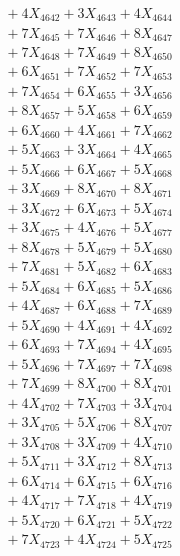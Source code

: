 \documentclass[a4paper,10pt]{article}
\begin{document}
{\begin{align}
&\;  + 4 X_{4642} + 3 X_{4643} + 4 X_{4644} \\[0.3ex]
&\;  + 7 X_{4645} + 7 X_{4646} + 8 X_{4647} \\[0.3ex]
&\;  + 7 X_{4648} + 7 X_{4649} + 8 X_{4650} \\[0.3ex]
&\;  + 6 X_{4651} + 7 X_{4652} + 7 X_{4653} \\[0.3ex]
&\;  + 7 X_{4654} + 6 X_{4655} + 3 X_{4656} \\[0.3ex]
&\;  + 8 X_{4657} + 5 X_{4658} + 6 X_{4659} \\[0.5ex]\allowbreak
&\;  + 6 X_{4660} + 4 X_{4661} + 7 X_{4662} \\[0.3ex]
&\;  + 5 X_{4663} + 3 X_{4664} + 4 X_{4665} \\[0.3ex]
&\;  + 5 X_{4666} + 6 X_{4667} + 5 X_{4668} \\[0.3ex]
&\;  + 3 X_{4669} + 8 X_{4670} + 8 X_{4671} \\[0.3ex]
&\;  + 3 X_{4672} + 6 X_{4673} + 5 X_{4674} \\[0.3ex]
&\;  + 3 X_{4675} + 4 X_{4676} + 5 X_{4677} \\[0.3ex]
&\;  + 8 X_{4678} + 5 X_{4679} + 5 X_{4680} \\[0.3ex]
&\;  + 7 X_{4681} + 5 X_{4682} + 6 X_{4683} \\[0.3ex]
&\;  + 5 X_{4684} + 6 X_{4685} + 5 X_{4686} \\[0.3ex]
&\;  + 4 X_{4687} + 6 X_{4688} + 7 X_{4689} \\[0.5ex]\allowbreak
&\;  + 5 X_{4690} + 4 X_{4691} + 4 X_{4692} \\[0.3ex]
&\;  + 6 X_{4693} + 7 X_{4694} + 4 X_{4695} \\[0.3ex]
&\;  + 5 X_{4696} + 7 X_{4697} + 7 X_{4698} \\[0.3ex]
&\;  + 7 X_{4699} + 8 X_{4700} + 8 X_{4701} \\[0.3ex]
&\;  + 4 X_{4702} + 7 X_{4703} + 3 X_{4704} \\[0.3ex]
&\;  + 3 X_{4705} + 5 X_{4706} + 8 X_{4707} \\[0.3ex]
&\;  + 3 X_{4708} + 3 X_{4709} + 4 X_{4710} \\[0.3ex]
&\;  + 5 X_{4711} + 3 X_{4712} + 8 X_{4713} \\[0.3ex]
&\;  + 6 X_{4714} + 6 X_{4715} + 6 X_{4716} \\[0.3ex]
&\;  + 4 X_{4717} + 7 X_{4718} + 4 X_{4719} \\[0.5ex]\allowbreak
&\;  + 5 X_{4720} + 6 X_{4721} + 5 X_{4722} \\[0.3ex]
&\;  + 7 X_{4723} + 4 X_{4724} + 5 X_{4725} \\[0.3ex]

\end{align}}
\end{document}
